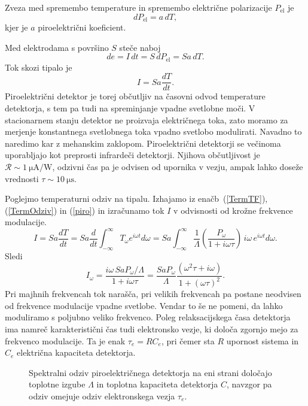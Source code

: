 Zveza med spremembo temperature in spremembo električne polarizacije $P_\mathrm{el}$ je
\begin{equation}
dP_\mathrm{el} = a\, dT,
\end{equation}
kjer je $a$ piroelektrični koeficient. 

Med elektrodama s površino $S$ steče naboj
\begin{equation}
de = I\, dt = S\, dP_\mathrm{el} = S a\, dT.
\end{equation}
Tok skozi tipalo je
\begin{equation}
I = S a \frac{dT}{dt}.
\label{piro}
\end{equation}
Piroelektrični detektor je torej občutljiv na časovni odvod temperature detektorja, 
s tem pa tudi na spreminjanje vpadne svetlobne moči. V stacionarnem stanju 
detektor ne proizvaja električnega toka, zato moramo za merjenje 
konstantnega svetlobnega toka vpadno svetlobo modulirati.
Navadno to naredimo kar z mehanskim zaklopom. Piroelektrični detektorji
se večinoma uporabljajo kot preprosti infrardeči detektorji.
Njihova občutljivost je $\mathcal{R} \sim 1~\si{\micro\ampere/\watt}$, odzivni čas pa je odvisen od 
upornika v vezju, ampak lahko doseže vrednosti $\tau \sim 10~\si{\micro\second}$.

Poglejmo temperaturni odziv na tipalu. Izhajamo iz enačb~(\ref{TermTF}), (\ref{TermOdziv}) in
(\ref{piro}) in izračunamo tok $I$ v odvisnosti od krožne frekvence modulacije.
\begin{equation}
I = Sa \frac{dT}{dt} = Sa \frac{d}{dt} \int_{-\infty}^{\infty} T_\omega e^{i\omega t}d\omega 
=Sa\int_{-\infty}^{\infty}\frac{1}{\Lambda}\left(\frac{P_\omega}{1+i \omega \tau}\right) \,i \omega\,
e^{i\omega t}d\omega.
\end{equation}
Sledi 
\begin{equation}
I_\omega = \frac{i \omega\, SaP_\omega/\Lambda}{1 + i \omega \tau} = 
\frac{SaP_\omega}{\Lambda}\frac{(\omega^2\tau + i \omega)}{1+(\omega\tau)^2}.
\end{equation}
Pri majhnih frekvencah tok narašča, pri velikih frekvencah pa postane neodvisen od
frekvence modulacije vpadne svetlobe. Vendar to še ne pomeni, da lahko moduliramo s poljubno 
veliko frekvenco. Poleg relaksacijskega časa detektorja ima namreč karakteristični čas tudi
elektronsko vezje, ki določa zgornjo mejo za frekvenco modulacije. 
Ta je enak $\tau_e = RC_e$, pri čemer
sta $R$ upornost sistema in $C_e$ električna kapaciteta detektorja. 
\begin{figure}[h]
\centering
\def\svgwidth{90truemm} 

\caption{Spektralni odziv piroelektričnega detektorja na eni strani določajo toplotne izgube 
$\Lambda$ in toplotna kapaciteta detektorja $C$, navzgor pa odziv omejuje odziv elektronskega vezja $\tau_e$.}
\label{fig:Piro}
\end{figure}

